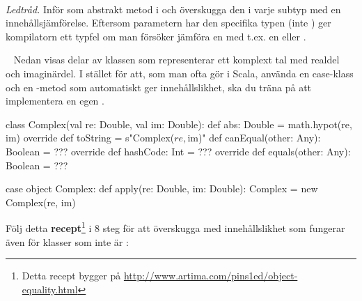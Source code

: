 \SOLUTION


\TaskSolved \what
~\\\emph{Ledtråd.} Inför  som abstrakt metod i  och överskugga den i varje subtyp med en innehållsjämförelse. Eftersom parametern har den specifika typen  (inte ) ger kompilatorn ett typfel om man försöker jämföra en  med t.ex. en  eller .



\QUESTEND







\QUESTBEGIN

\Task \label{task:equals:Complex} \what~   Nedan visas delar av klassen  som representerar ett komplext tal med realdel och imaginärdel. I stället för att, som man ofta gör i Scala, använda en case-klass och en -metod som automatiskt ger innehållslikhet, ska du träna på att implementera en egen .
\begin{Code}
class Complex(val re: Double, val im: Double):
  def abs: Double = math.hypot(re, im)
  override def toString = s"Complex($re, $im)"
  def canEqual(other: Any): Boolean = ???
  override def hashCode: Int  = ???
  override def equals(other: Any): Boolean = ???

case object Complex:
  def apply(re: Double, im: Double): Complex = new Complex(re, im)
\end{Code}
Följ detta \textbf{recept}\footnote{Detta recept bygger på \url{http://www.artima.com/pins1ed/object-equality.html}} i 8 steg för att överskugga  med innehållslikhet som fungerar även för klasser som inte är :

